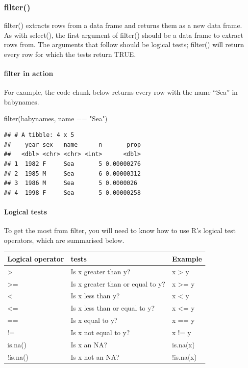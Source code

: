 \documentclass[
]{article}
\newenvironment{Shaded}{\begin{snugshade}}{\end{snugshade}}
\newcommand{\FunctionTok}[1]{\textcolor[rgb]{0.00,0.00,0.00}{#1}}
\newcommand{\NormalTok}[1]{#1}
\newcommand{\SpecialCharTok}[1]{\textcolor[rgb]{0.00,0.00,0.00}{#1}}
\newcommand{\StringTok}[1]{\textcolor[rgb]{0.31,0.60,0.02}{#1}}
\begin{document}
\hypertarget{filter}{%
\subsubsection{filter()}\label{filter}}

filter() extracts rows from a data frame and returns them as a new data
frame. As with select(), the first argument of filter() should be a data
frame to extract rows from. The arguments that follow should be logical
tests; filter() will return every row for which the tests return TRUE.

\hypertarget{filter-in-action}{%
\paragraph{filter in action}\label{filter-in-action}}

For example, the code chunk below returns every row with the name
``Sea'' in babynames.

\begin{Shaded}
\begin{Highlighting}[]
\FunctionTok{filter}\NormalTok{(babynames, name }\SpecialCharTok{==} \StringTok{"Sea"}\NormalTok{)}
\end{Highlighting}
\end{Shaded}

\begin{verbatim}
## # A tibble: 4 x 5
##    year sex   name      n       prop
##   <dbl> <chr> <chr> <int>      <dbl>
## 1  1982 F     Sea       5 0.00000276
## 2  1985 M     Sea       6 0.00000312
## 3  1986 M     Sea       5 0.0000026 
## 4  1998 F     Sea       5 0.00000258
\end{verbatim}

\hypertarget{logical-tests}{%
\paragraph{Logical tests}\label{logical-tests}}

To get the most from filter, you will need to know how to use R's
logical test operators, which are summarised below.

\begin{longtable}[]{@{}lll@{}}
\toprule()
Logical operator & tests & Example \\
\midrule()
\endhead
\textgreater{} & Is x greater than y? & x \textgreater{} y \\
\textgreater= & Is x greater than or equal to y? & x \textgreater= y \\
\textless{} & Is x less than y? & x \textless{} y \\
\textless= & Is x less than or equal to y? & x \textless= y \\
== & Is x equal to y? & x == y \\
!= & Is x not equal to y? & x != y \\
is.na() & Is x an NA? & is.na(x) \\
!is.na() & Is x not an NA? & !is.na(x) \\
\bottomrule()
\end{longtable}
\end{document}
